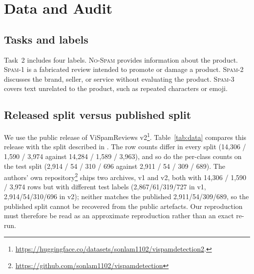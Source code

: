 \documentclass[12pt,a4paper]{article}
\newcommand{\vispam}{ViSpamReviews}
\begin{document}
\section{Data and Audit}
\subsection{Tasks and labels}
Task~2 includes four labels. \textsc{No-Spam} provides information about the product. \textsc{Spam-1} is a fabricated review intended to promote or damage a product. \textsc{Spam-2} discusses the brand, seller, or service without evaluating the product. \textsc{Spam-3} covers text unrelated to the product, such as repeated characters or emoji.

\subsection{Released split versus published split}
We use the public release of \vispam{} v2\footnote{\url{https://huggingface.co/datasets/sonlam1102/vispamdetection2}.}. Table~\ref{tab:data} compares this release with the split described in \cite{vispam2024}. The row counts differ in every split (14{,}306 / 1{,}590 / 3{,}974 against 14{,}284 / 1{,}589 / 3{,}963), and so do the per-class counts on the test split (2{,}914 / 54 / 310 / 696 against 2{,}911 / 54 / 309 / 689). The authors' own repository\footnote{\url{https://github.com/sonlam1102/vispamdetection}} ships two archives, v1 and v2, both with 14{,}306 / 1{,}590 / 3{,}974 rows but with different test labels (2{,}867/61/319/727 in v1, 2{,}914/54/310/696 in v2); neither matches the published 2{,}911/54/309/689, so the published split cannot be recovered from the public artefacts. Our reproduction must therefore be read as an approximate reproduction rather than an exact re-run.
\end{document}
